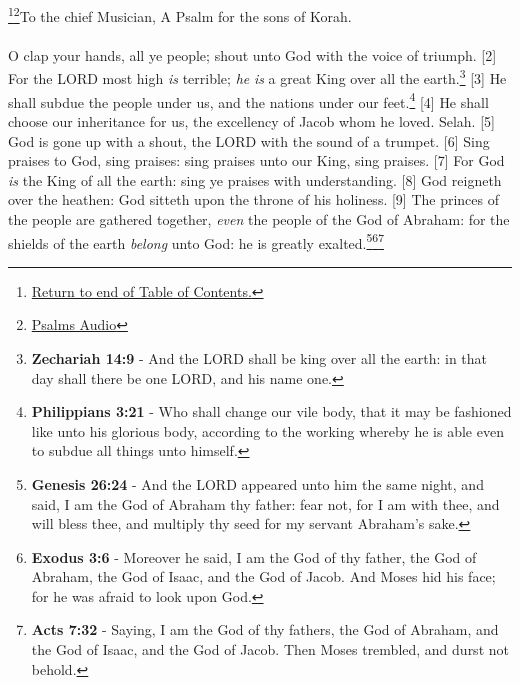 \footnote{\textcolor[cmyk]{0.99998,1,0,0}{\hyperlink{TOC}{Return to end of Table of Contents.}}}\footnote{\href{https://www.audioverse.org/english/audiobibles/books/ENGKJV/O/Ps/1}{\textcolor[cmyk]{0.99998,1,0,0}{Psalms Audio}}}\textcolor[cmyk]{0.99998,1,0,0}{To the chief Musician, A Psalm for the sons of Korah.}\\
\\
\textcolor[cmyk]{0.99998,1,0,0}{O clap your hands, all ye people; shout unto God with the voice of triumph.}
[2] \textcolor[cmyk]{0.99998,1,0,0}{For the LORD most high \emph{is} terrible; \emph{he} \emph{is} a great King over all the earth.}\footnote{\textbf{Zechariah 14:9}  - And the LORD shall be king over all the earth: in that day shall there be one LORD, and his name one.}
[3] \textcolor[cmyk]{0.99998,1,0,0}{He shall subdue the people under us, and the nations under our feet.}\footnote{\textbf{Philippians 3:21} - Who shall change our vile body, that it may be fashioned like unto his glorious body, according to the working whereby he is able even to subdue all things unto himself.}
[4] \textcolor[cmyk]{0.99998,1,0,0}{He shall choose our inheritance for us, the excellency of Jacob whom he loved. Selah.}
[5] \textcolor[cmyk]{0.99998,1,0,0}{God is gone up with a shout, the LORD with the sound of a trumpet.}
[6] \textcolor[cmyk]{0.99998,1,0,0}{Sing praises to God, sing praises: sing praises unto our King, sing praises.}
[7] \textcolor[cmyk]{0.99998,1,0,0}{For God \emph{is} the King of all the earth: sing ye praises with understanding.}
[8] \textcolor[cmyk]{0.99998,1,0,0}{God reigneth over the heathen: God sitteth upon the throne of his holiness.}
[9] \textcolor[cmyk]{0.99998,1,0,0}{The princes of the people are gathered together, \emph{even} the people of the God of Abraham: for the shields of the earth \emph{belong} unto God: he is greatly exalted.}\footnote{\textbf{Genesis 26:24} - And the LORD appeared unto him the same night, and said, I am the God of Abraham thy father: fear not, for I am with thee, and will bless thee, and multiply thy seed for my servant Abraham’s sake.}\footnote{\textbf{Exodus 3:6} - Moreover he said, I am the God of thy father, the God of Abraham, the God of Isaac, and the God of Jacob. And Moses hid his face; for he was afraid to look upon God.}\footnote{\textbf{Acts 7:32} - Saying, I am the God of thy fathers, the God of Abraham, and the God of Isaac, and the God of Jacob. Then Moses trembled, and durst not behold.}
